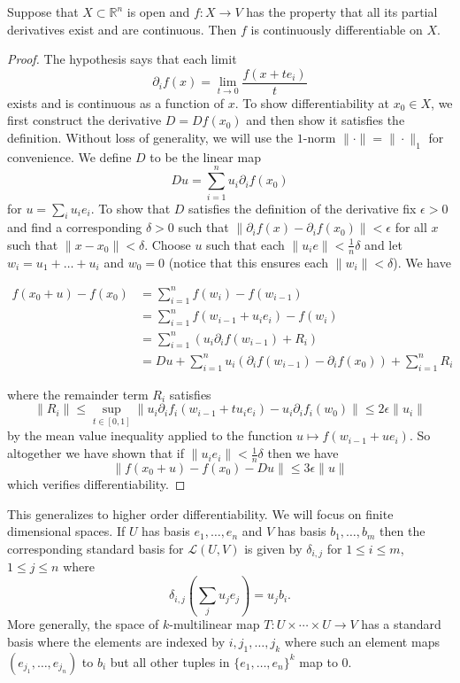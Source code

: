 \documentclass[twoside, a4paper, 10pt]{amsart}
\begin{document}
\begin{prop} Suppose that $X \subset \mathbb{R}^n$ is open and $f:X \to V$ has the property that all its partial derivatives exist and are continuous. Then $f$ is continuously differentiable on $X$.

\end{prop}

\begin{proof} The hypothesis says that each limit $$\partial_if(x) = \lim_{t \to 0} \frac{f(x+te_i)}{t}$$ exists and is continuous as a function of $x$. To show differentiability at $x_0 \in X$, we first construct the derivative $D= Df (x_0) $ and then show it satisfies the definition. Without loss of generality, we will use the $1$-norm $\| \cdot \| = \| \cdot \|_1$ for convenience. We define $D$ to be the linear map $$Du = \sum_{i=1}^n u_i \partial_i f (x_0)$$ for $u = \sum_i u_i e_i$. To show that $D$ satisfies the definition of the derivative fix $\epsilon >0$ and find a corresponding $\delta >0$ such that $\| \partial_i f(x) - \partial_if (x_0) \| < \epsilon$ for all $x$ such that $\|x - x_0\| < \delta$. Choose $u$ such that each $\|u_ie\| < \frac{1}{n} \delta$ and let $w_i = u_1 + \ldots + u_i$ and $w_0 = 0$ (notice that this ensures each $\|w_i \| < \delta$). We have 

\begin{align*} f(x_0 + u) - f(x_0) &= \sum_{i=1}^n f(w_i) - f(w_{i-1}) \\ &= \sum_{i=1}^n f(w_{i-1} + u_i e_i) - f(w_{i}) \\ &= \sum_{i=1}^n (u_i \partial_i f(w_{i-1}) + R_i) \\ &= Du + \sum_{i=1}^n u_i \left(\partial_i f(w_{i-1}) - \partial_i f(x_0) \right) + \sum_{i=1}^n R_i \end{align*}

where the remainder term $R_i$ satisfies $$\|R_i \| \leq \sup_{t \in [0,1]} \| u_i \partial_i f_i (w_{i-1} + tu_ie_i) - u_i \partial_i f_i (w_0)\| \leq 2 \epsilon \|u_i\|$$ by the mean value inequality applied to the function $u \mapsto f(w_{i-1} + ue_i)$. So altogether we have shown that if $\|u_i e_i\| < \frac{1}{n}\delta$ then we have $$\|f(x_0 + u) -f(x_0) - Du\| \leq 3\epsilon \|u\|$$ which verifies differentiability. \end{proof}

This generalizes to higher order differentiability. We will focus on finite dimensional spaces. If $U$ has basis $e_1, \ldots, e_n$ and $V$ has basis $b_1, \ldots, b_m$ then the corresponding standard basis for $\mathcal{L}(U,V)$ is given by $\delta_{i,j}$ for $1 \leq i \leq m$, $1 \leq j \leq n$ where $$\delta_{i,j}\left( \sum_{j} u_j e_j \right) = u_j b_i.$$ More generally, the space of $k$-multilinear map $T:U \times \cdots \times U \to V$ has a standard basis where the elements are indexed by $i, j_1, \ldots, j_k$ where such an element maps  $(e_{j_1}, \ldots, e_{j_n})$ to $b_i$ but all other tuples in $\{e_1, \ldots, e_n\}^k$ map to $0$.
\end{document}
